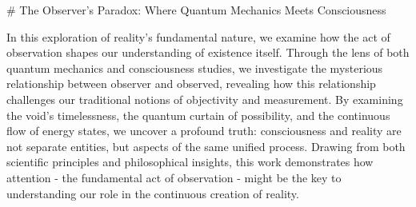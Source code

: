 # The Observer's Paradox: Where Quantum Mechanics Meets Consciousness

In this exploration of reality's fundamental nature, we examine how the act of observation shapes our understanding of existence itself. Through the lens of both quantum mechanics and consciousness studies, we investigate the mysterious relationship between observer and observed, revealing how this relationship challenges our traditional notions of objectivity and measurement. By examining the void's timelessness, the quantum curtain of possibility, and the continuous flow of energy states, we uncover a profound truth: consciousness and reality are not separate entities, but aspects of the same unified process. Drawing from both scientific principles and philosophical insights, this work demonstrates how attention - the fundamental act of observation - might be the key to understanding our role in the continuous creation of reality.

